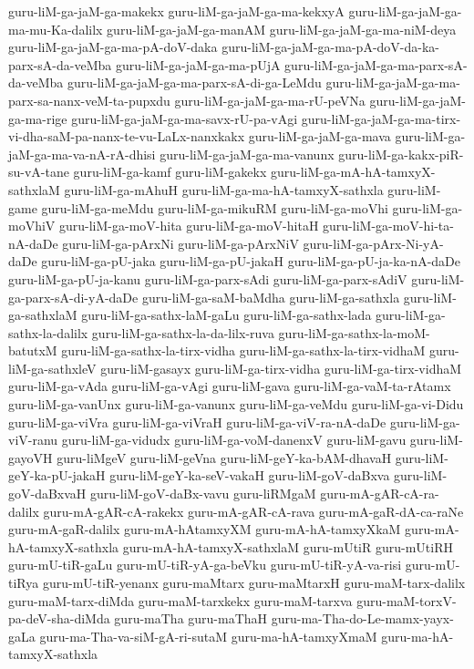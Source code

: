 {guru-liM-ga-jaM-ga-makekx
guru-liM-ga-jaM-ga-ma-kekxyA
guru-liM-ga-jaM-ga-ma-mu-Ka-dalilx
guru-liM-ga-jaM-ga-manAM
guru-liM-ga-jaM-ga-ma-niM-deya
guru-liM-ga-jaM-ga-ma-pA-doV-daka
guru-liM-ga-jaM-ga-ma-pA-doV-da-ka-parx-sA-da-veMba
guru-liM-ga-jaM-ga-ma-pUjA
guru-liM-ga-jaM-ga-ma-parx-sA-da-veMba
guru-liM-ga-jaM-ga-ma-parx-sA-di-ga-LeMdu
guru-liM-ga-jaM-ga-ma-parx-sa-nanx-veM-ta-pupxdu
guru-liM-ga-jaM-ga-ma-rU-peVNa
guru-liM-ga-jaM-ga-ma-rige
guru-liM-ga-jaM-ga-ma-savx-rU-pa-vAgi
guru-liM-ga-jaM-ga-ma-tirx-vi-dha-saM-pa-nanx-te-vu-LaLx-nanxkakx
guru-liM-ga-jaM-ga-mava
guru-liM-ga-jaM-ga-ma-va-nA-rA-dhisi
guru-liM-ga-jaM-ga-ma-vanunx
guru-liM-ga-kakx-piR-su-vA-tane
guru-liM-ga-kamf
guru-liM-gakekx
guru-liM-ga-mA-hA-tamxyX-sathxlaM
guru-liM-ga-mAhuH
guru-liM-ga-ma-hA-tamxyX-sathxla
guru-liM-game
guru-liM-ga-meMdu
guru-liM-ga-mikuRM
guru-liM-ga-moVhi
guru-liM-ga-moVhiV
guru-liM-ga-moV-hita
guru-liM-ga-moV-hitaH
guru-liM-ga-moV-hi-ta-nA-daDe
guru-liM-ga-pArxNi
guru-liM-ga-pArxNiV
guru-liM-ga-pArx-Ni-yA-daDe
guru-liM-ga-pU-jaka
guru-liM-ga-pU-jakaH
guru-liM-ga-pU-ja-ka-nA-daDe
guru-liM-ga-pU-ja-kanu
guru-liM-ga-parx-sAdi
guru-liM-ga-parx-sAdiV
guru-liM-ga-parx-sA-di-yA-daDe
guru-liM-ga-saM-baMdha
guru-liM-ga-sathxla
guru-liM-ga-sathxlaM
guru-liM-ga-sathx-laM-gaLu
guru-liM-ga-sathx-lada
guru-liM-ga-sathx-la-dalilx
guru-liM-ga-sathx-la-da-lilx-ruva
guru-liM-ga-sathx-la-moM-batutxM
guru-liM-ga-sathx-la-tirx-vidha
guru-liM-ga-sathx-la-tirx-vidhaM
guru-liM-ga-sathxleV
guru-liM-gasayx
guru-liM-ga-tirx-vidha
guru-liM-ga-tirx-vidhaM
guru-liM-ga-vAda
guru-liM-ga-vAgi
guru-liM-gava
guru-liM-ga-vaM-ta-rAtamx
guru-liM-ga-vanUnx
guru-liM-ga-vanunx
guru-liM-ga-veMdu
guru-liM-ga-vi-Didu
guru-liM-ga-viVra
guru-liM-ga-viVraH
guru-liM-ga-viV-ra-nA-daDe
guru-liM-ga-viV-ranu
guru-liM-ga-vidudx
guru-liM-ga-voM-danenxV
guru-liM-gavu
guru-liM-gayoVH
guru-liMgeV
guru-liM-geVna
guru-liM-geY-ka-bAM-dhavaH
guru-liM-geY-ka-pU-jakaH
guru-liM-geY-ka-seV-vakaH
guru-liM-goV-daBxva
guru-liM-goV-daBxvaH
guru-liM-goV-daBx-vavu
guru-liRMgaM
guru-mA-gAR-cA-ra-dalilx
guru-mA-gAR-cA-rakekx
guru-mA-gAR-cA-rava
guru-mA-gaR-dA-ca-raNe
guru-mA-gaR-dalilx
guru-mA-hAtamxyXM
guru-mA-hA-tamxyXkaM
guru-mA-hA-tamxyX-sathxla
guru-mA-hA-tamxyX-sathxlaM
guru-mUtiR
guru-mUtiRH
guru-mU-tiR-gaLu
guru-mU-tiR-yA-ga-beVku
guru-mU-tiR-yA-va-risi
guru-mU-tiRya
guru-mU-tiR-yenanx
guru-maMtarx
guru-maMtarxH
guru-maM-tarx-dalilx
guru-maM-tarx-diMda
guru-maM-tarxkekx
guru-maM-tarxva
guru-maM-torxV-pa-deV-sha-diMda
guru-maTha
guru-maThaH
guru-ma-Tha-do-Le-mamx-yayx-gaLa
guru-ma-Tha-va-siM-gA-ri-sutaM
guru-ma-hA-tamxyXmaM
guru-ma-hA-tamxyX-sathxla
}
